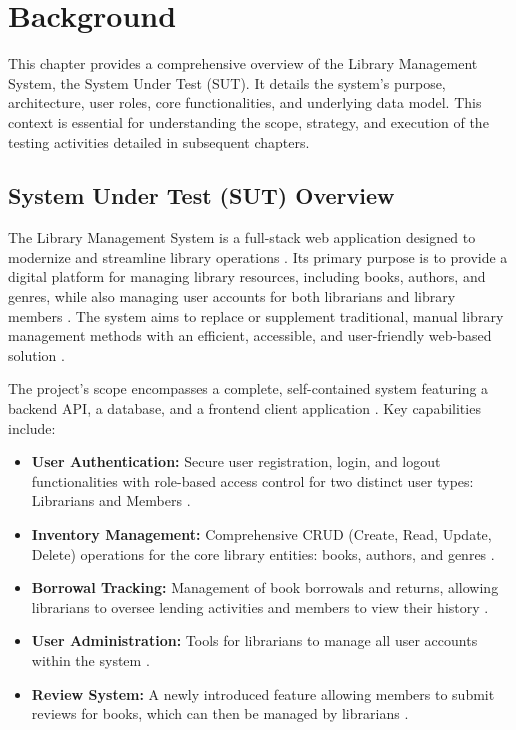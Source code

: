 \chapter{Background}
\label{cha:background}

This chapter provides a comprehensive overview of the Library Management System, the System Under Test (SUT). It details the system's purpose, architecture, user roles, core functionalities, and underlying data model. This context is essential for understanding the scope, strategy, and execution of the testing activities detailed in subsequent chapters.

\section{System Under Test (SUT) Overview}
\label{sec:sut_overview}

The Library Management System is a full-stack web application designed to modernize and streamline library operations \cite{srs}. Its primary purpose is to provide a digital platform for managing library resources, including books, authors, and genres, while also managing user accounts for both librarians and library members \cite{srs}. The system aims to replace or supplement traditional, manual library management methods with an efficient, accessible, and user-friendly web-based solution \cite{srs}.

The project's scope encompasses a complete, self-contained system featuring a backend API, a database, and a frontend client application \cite{srs}. Key capabilities include:
\begin{itemize}
    \item \textbf{User Authentication:} Secure user registration, login, and logout functionalities with role-based access control for two distinct user types: Librarians and Members \cite{srs}.
    \item \textbf{Inventory Management:} Comprehensive CRUD (Create, Read, Update, Delete) operations for the core library entities: books, authors, and genres \cite{srs}.
    \item \textbf{Borrowal Tracking:} Management of book borrowals and returns, allowing librarians to oversee lending activities and members to view their history \cite{srs}.
    \item \textbf{User Administration:} Tools for librarians to manage all user accounts within the system \cite{srs}.
    \item \textbf{Review System:} A newly introduced feature allowing members to submit reviews for books, which can then be managed by librarians \cite{srs}.
\end{itemize}

